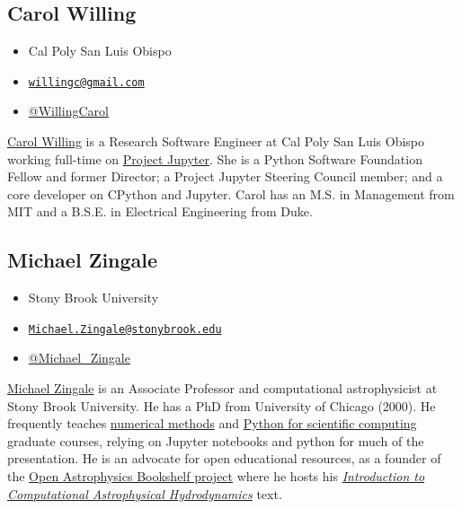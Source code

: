 \documentclass[]{book}
\providecommand{\tightlist}{%
  \setlength{\itemsep}{0pt}\setlength{\parskip}{0pt}}
\begin{document}
\subsection*{Carol Willing}\label{carol-willing}

\begin{itemize}
\tightlist
\item
  Cal Poly San Luis Obispo
\item
  \href{mailto:willingc@gmail.com}{\nolinkurl{willingc@gmail.com}}
\item
  \href{https://twitter.com/WillingCarol}{@WillingCarol}
\end{itemize}

\href{https://www.willingconsulting.com/about/}{Carol Willing} is a
Research Software Engineer at Cal Poly San Luis Obispo working full-time
on \href{https://jupyter.org/}{Project Jupyter}. She is a Python
Software Foundation Fellow and former Director; a Project Jupyter
Steering Council member; and a core developer on CPython and Jupyter.
Carol has an M.S. in Management from MIT and a B.S.E. in Electrical
Engineering from Duke.

\subsection*{Michael Zingale}\label{michael-zingale}

\begin{itemize}
\tightlist
\item
  Stony Brook University
\item
  \href{mailto:Michael.Zingale@stonybrook.edu}{\nolinkurl{Michael.Zingale@stonybrook.edu}}
\item
  \href{https://twitter.com/Michael_Zingale}{@Michael\_Zingale}
\end{itemize}

\href{http://www.astro.sunysb.edu/mzingale/}{Michael Zingale} is an
Associate Professor and computational astrophysicist at Stony Brook
University. He has a PhD from University of Chicago (2000). He
frequently teaches
\href{http://bender.astro.sunysb.edu/classes/numerical_methods/}{numerical
methods} and
\href{http://bender.astro.sunysb.edu/classes/python-science/}{Python for
scientific computing} graduate courses, relying on Jupyter notebooks and
python for much of the presentation. He is an advocate for open
educational resources, as a founder of the
\href{https://github.com/Open-Astrophysics-Bookshelf/}{Open Astrophysics
Bookshelf project} where he hosts his
\href{http://bender.astro.sunysb.edu/hydro_by_example/CompHydroTutorial.pdf}{\emph{Introduction
to Computational Astrophysical Hydrodynamics}} text.
\end{document}

